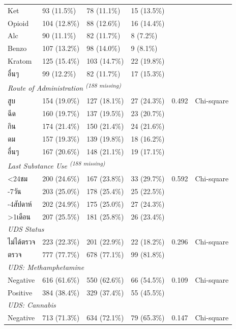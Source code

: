 \begin{table}[htbp]
\begin{tabular}{llllll}
\quad Ket & 93 (11.5\%) & 78 (11.1\%) & 15 (13.5\%) &  &  \\
\quad Opioid & 104 (12.8\%) & 88 (12.6\%) & 16 (14.4\%) &  &  \\
\quad Alc & 90 (11.1\%) & 82 (11.7\%) & 8 (7.2\%) &  &  \\
\quad Benzo & 107 (13.2\%) & 98 (14.0\%) & 9 (8.1\%) &  &  \\
\quad Kratom & 125 (15.4\%) & 103 (14.7\%) & 22 (19.8\%) &  &  \\
\quad อื่นๆ & 99 (12.2\%) & 82 (11.7\%) & 17 (15.3\%) &  &  \\
\multicolumn{6}{l}{\textit{Route of Administration \textsuperscript{(188 missing)}}} \\
\quad สูบ & 154 (19.0\%) & 127 (18.1\%) & 27 (24.3\%) & 0.492 & Chi-square \\
\quad ฉีด & 160 (19.7\%) & 137 (19.5\%) & 23 (20.7\%) &  &  \\
\quad กิน & 174 (21.4\%) & 150 (21.4\%) & 24 (21.6\%) &  &  \\
\quad ดม & 157 (19.3\%) & 139 (19.8\%) & 18 (16.2\%) &  &  \\
\quad อื่นๆ & 167 (20.6\%) & 148 (21.1\%) & 19 (17.1\%) &  &  \\
\multicolumn{6}{l}{\textit{Last Substance Use \textsuperscript{(188 missing)}}} \\
\quad \textless{}24ชม & 200 (24.6\%) & 167 (23.8\%) & 33 (29.7\%) & 0.592 & Chi-square \\
\quad 1-7วัน & 203 (25.0\%) & 178 (25.4\%) & 25 (22.5\%) &  &  \\
\quad 1-4สัปดาห์ & 202 (24.9\%) & 175 (25.0\%) & 27 (24.3\%) &  &  \\
\quad \textgreater{}1เดือน & 207 (25.5\%) & 181 (25.8\%) & 26 (23.4\%) &  &  \\
\multicolumn{6}{l}{\textit{UDS Status}} \\
\quad ไม่ได้ตรวจ & 223 (22.3\%) & 201 (22.9\%) & 22 (18.2\%) & 0.296 & Chi-square \\
\quad ตรวจ & 777 (77.7\%) & 678 (77.1\%) & 99 (81.8\%) &  &  \\
\multicolumn{6}{l}{\textit{UDS: Methamphetamine}} \\
\quad Negative & 616 (61.6\%) & 550 (62.6\%) & 66 (54.5\%) & 0.109 & Chi-square \\
\quad Positive & 384 (38.4\%) & 329 (37.4\%) & 55 (45.5\%) &  &  \\
\multicolumn{6}{l}{\textit{UDS: Cannabis}} \\
\quad Negative & 713 (71.3\%) & 634 (72.1\%) & 79 (65.3\%) & 0.147 & Chi-square \\

\end{tabular}
\end{table}
